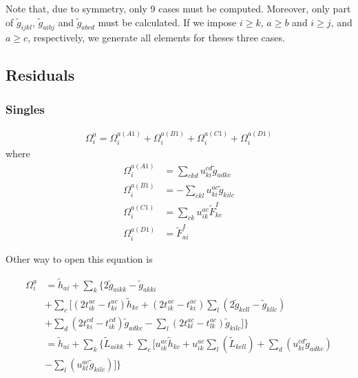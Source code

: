 Note that, due to symmetry, only 9 cases must be computed.
Moreover, only part of ${\tilde g}_{ijkl}$, ${\tilde g}_{aibj}$ and ${\tilde g}_{abcd}$ must be calculated.
If we impose $i\ge k$, $a\ge b$ and $i\ge j$, and $a\ge c$, respectively, we generate all elements for theses three cases.


\subsection{Residuals}
\hypertarget{sec:ccsd_res}{}
\label{sec:ccsd_res}

\subsubsection{Singles}
\hypertarget{sec:ccsd_res_sing}{}
\label{sec:ccsd_res_sing}


\begin{equation}
  \begin{split}
    \Omega_i^a=\Omega_i^{a(A1)}+\Omega_i^{a(B1)}+\Omega_i^{a(C1)}+\Omega_i^{a(D1)}
  \end{split}
\end{equation}
where
\begin{align}
  \Omega_i^{a(A1)}&=\sum_{ckd}u_{ki}^{cd}{\tilde g}_{adkc}\\
  \Omega_i^{a(B1)}&=-\sum_{ckl}u_{ki}^{ac}{\tilde g}_{kilc}\\
  \Omega_i^{a(C1)}&=\sum_{ck}u_{ik}^{ac}{\tilde F}_{kc}^{I}\\
  \Omega_i^{a(D1)}&={\tilde F}_{ai}^{I}
\end{align}

Other way to open this equation is

\begin{equation}
  \begin{split}
    \Omega_i^a&={\tilde h}_{ai}+\sum_k\{2{\tilde g}_{aikk}-{\tilde g}_{akki}\\
    &+\sum_c[(2t_{ik}^{ac}-t_{ki}^{ac}){\tilde h}_{kc}+(2t_{ik}^{ac}-t_{ki}^{ac})\sum_l(2{\tilde g}_{kcll}-{\tilde g}_{kllc})\\
    &+\sum_d(2t_{ki}^{cd}-t_{ik}^{cd}){\tilde g}_{adkc}-\sum_l(2t_{kl}^{ac}-t_{lk}^{ac}){\tilde g}_{kilc}]\}\\
    &={\tilde h}_{ai}+\sum_{k}\{{\tilde L}_{aikk}+\sum_c[u_{ik}^{ac}{\tilde h}_{kc}+u_{ik}^{ac}\sum_l({\tilde L}_{kcll})+\sum_d(u_{ki}^{cd}{\tilde g}_{adkc})\\
      &-\sum_l(u_{kl}^{ac}{\tilde g}_{kilc})]\}
   \end{split}
\end{equation}


